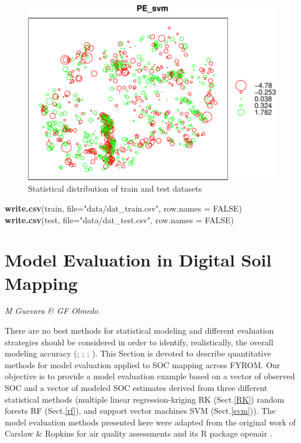 \documentclass[10pt,b5paper,]{book}
\newenvironment{Shaded}{\begin{snugshade}}{\end{snugshade}}
\newcommand{\DataTypeTok}[1]{\textcolor[rgb]{0.13,0.29,0.53}{#1}}
\newcommand{\KeywordTok}[1]{\textcolor[rgb]{0.13,0.29,0.53}{\textbf{#1}}}
\newcommand{\NormalTok}[1]{#1}
\newcommand{\OtherTok}[1]{\textcolor[rgb]{0.56,0.35,0.01}{#1}}
\newcommand{\StringTok}[1]{\textcolor[rgb]{0.31,0.60,0.02}{#1}}
\theoremstyle{definition}
\theoremstyle{definition}
\theoremstyle{definition}
\theoremstyle{remark}
\begin{document}
\begin{figure}
\centering
\includegraphics{SOCMapping_files/figure-latex/unnamed-chunk-94-1.pdf}
\caption{\label{fig:unnamed-chunk-94}Statistical distribution of train and
test datasets}
\end{figure}

\begin{Shaded}
\begin{Highlighting}[]
\KeywordTok{write.csv}\NormalTok{(train, }\DataTypeTok{file=}\StringTok{"data/dat_train.csv"}\NormalTok{, }\DataTypeTok{row.names =} \OtherTok{FALSE}\NormalTok{)}
\KeywordTok{write.csv}\NormalTok{(test, }\DataTypeTok{file=}\StringTok{"data/dat_test.csv"}\NormalTok{, }\DataTypeTok{row.names =} \OtherTok{FALSE}\NormalTok{)}
\end{Highlighting}
\end{Shaded}

\hypertarget{evaluation}{%
\chapter{Model Evaluation in Digital Soil Mapping}\label{evaluation}}

\emph{M Guevara \& GF Olmedo}

There are no best methods for statistical modeling and different
evaluation strategies should be considered in order to identify,
realistically, the overall modeling accuracy (\citet{ho2002simple};
\citet{qiao2015no}; \citet{soil-2017-40};
\citet{nussbaum2018evaluation}). This Section is devoted to describe
quantitative methods for model evaluation applied to SOC mapping across
FYROM. Our objective is to provide a model evaluation example based on a
vector of observed SOC and a vector of modeled SOC estimates derived
from three different statistical methods (multiple linear
regression-kriging RK (Sect.\ref{RK}) random forests RF (Sect.\ref{rf}),
and support vector machines SVM (Sect.\ref{svm})). The model evaluation
methods presented here were adapted from the original work of Carslaw \&
Ropkins for air quality assessments and its R package openair
\citep{openair}.
\end{document}

